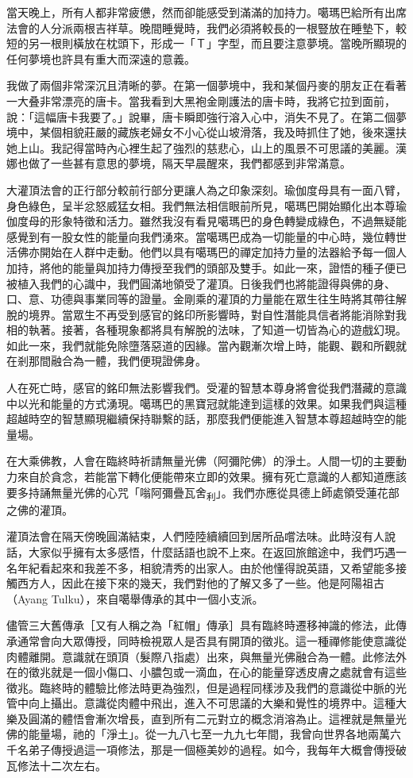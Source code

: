 當天晚上，所有人都非常疲憊，然而卻能感受到滿滿的加持力。噶瑪巴給所有出席法會的人分派兩根吉祥草。晚間睡覺時，我們必須將較長的一根豎放在睡墊下，較短的另一根則橫放在枕頭下，形成一「Ｔ」字型，而且要注意夢境。當晚所顯現的任何夢境也許具有重大而深遠的意義。

我做了兩個非常深沉且清晰的夢。在第一個夢境中，我和某個丹麥的朋友正在看著一大叠非常漂亮的唐卡。當我看到大黑袍金剛護法的唐卡時，我將它拉到面前，說：「這幅唐卡我要了。」說畢，唐卡瞬即強行溶入心中，消失不見了。在第二個夢境中，某個相貌莊嚴的藏族老婦女不小心從山坡滑落，我及時抓住了她，後來還扶她上山。我記得當時內心裡生起了強烈的慈悲心，山上的風景不可思議的美麗。漢娜也做了一些甚有意思的夢境，隔天早晨醒來，我們都感到非常滿意。

大灌頂法會的正行部分較前行部分更讓人為之印象深刻。瑜伽度母具有一面八臂，身色綠色，呈半忿怒威猛女相。我們無法相信眼前所見，噶瑪巴開始顯化出本尊瑜伽度母的形象特徵和活力。雖然我沒有看見噶瑪巴的身色轉變成綠色，不過無疑能感覺到有一股女性的能量向我們湧來。當噶瑪巴成為一切能量的中心時，幾位轉世活佛亦開始在人群中走動。他們以具有噶瑪巴的禪定加持力量的法器給予每一個人加持，將他的能量與加持力傳授至我們的頭部及雙手。如此一來，證悟的種子便已被植入我們的心識中，我們圓滿地領受了灌頂。日後我們也將能證得與佛的身、口、意、功德與事業同等的證量。金剛乘的灌頂的力量能在眾生往生時將其帶往解脫的境界。當眾生不再受到感官的銘印所影響時，對自性潛能具信者將能消除對我相的執著。接著，各種現象都將具有解脫的法味，了知道一切皆為心的遊戲幻現。如此一來，我們就能免除墮落惡道的因緣。當內觀漸次增上時，能觀、觀和所觀就在剎那間融合為一體，我們便現證佛身。

人在死亡時，感官的銘印無法影響我們。受灌的智慧本尊身將會從我們潛藏的意識中以光和能量的方式湧現。噶瑪巴的黑寶冠就能達到這樣的效果。如果我們與這種超越時空的智慧顯現繼續保持聯繫的話，那麼我們便能進入智慧本尊超越時空的能量場。

在大乘佛教，人會在臨終時祈請無量光佛（阿彌陀佛）的淨土。人間一切的主要動力來自於貪念，若能當下轉化便能帶來立即的效果。擁有死亡意識的人都知道應該要多持誦無量光佛的心咒「嗡阿彌疊瓦舍\textsubscript{利}」。我們亦應從具德上師處領受蓮花部之佛的灌頂。

灌頂法會在隔天傍晚圓滿結束，人們陸陸續續回到居所品嚐法味。此時沒有人說話，大家似乎擁有太多感悟，什麼話語也說不上來。在返回旅館途中，我們巧遇一名年紀看起來和我差不多，相貌清秀的出家人。由於他懂得說英語，又希望能多接觸西方人，因此在接下來的幾天，我們對他的了解又多了一些。他是阿陽祖古（Ayang
Tulku），來自噶舉傳承的其中一個小支派。

儘管三大舊傳承［又有人稱之為「紅帽」傳承］具有臨終時遷移神識的修法，此傳承通常會向大眾傳授，同時檢視眾人是否具有開頂的徵兆。這一種禪修能使意識從肉體離開。意識就在頭頂（髮際八指處）出來，與無量光佛融合為一體。此修法外在的徵兆就是一個小傷口、小膿包或一滴血，在心的能量穿透皮膚之處就會有這些徵兆。臨終時的體驗比修法時更為強烈，但是過程同樣涉及我們的意識從中脈的光管中向上攝出。意識從肉體中飛出，進入不可思議的大樂和覺性的境界中。這種大樂及圓滿的體悟會漸次增長，直到所有二元對立的概念消溶為止。這裡就是無量光佛的能量場，祂的「淨土」。從一九八七至一九九七年間，我曾向世界各地兩萬六千名弟子傳授過這一項修法，那是一個極美妙的過程。如今，我每年大概會傳授破瓦修法十二次左右。

